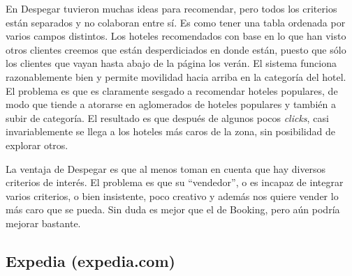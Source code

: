 \documentclass[12pt]{report}
\begin{document}
En Despegar tuvieron muchas ideas para recomendar, pero todos los criterios están separados y no colaboran entre sí. Es como tener una tabla ordenada por varios campos distintos. Los hoteles recomendados con base en lo que han visto otros clientes creemos que están desperdiciados en donde están, puesto que sólo los clientes que vayan hasta abajo de la página los verán. El sistema funciona razonablemente bien y permite movilidad hacia arriba en la categoría del hotel. El problema es que es claramente sesgado a recomendar hoteles populares, de modo que tiende a atorarse en aglomerados de hoteles populares y también a subir de categoría. El resultado es que después de algunos pocos \emph{clicks}, casi invariablemente se llega a los hoteles más caros de la zona, sin posibilidad de explorar otros.

La ventaja de Despegar es que al menos toman en cuenta que hay diversos criterios de interés. El problema es que su ``vendedor'', o es incapaz de integrar varios criterios, o bien insistente, poco creativo y además nos quiere vender lo más caro que se pueda. Sin duda es mejor que el de Booking, pero aún podría mejorar bastante.

\subsection*{Expedia (expedia.com)}
\end{document}
